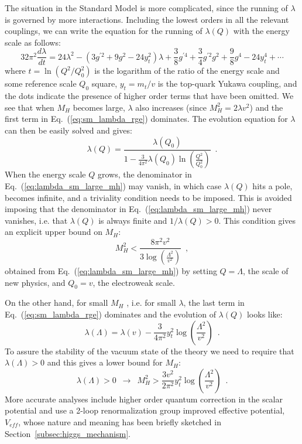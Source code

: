 \documentclass[prd,preprint,aps,floats,superscriptaddress,floatfix,nofootinbib]{revtex4}
\begin{document}
The situation in the Standard Model is more complicated, since the
running of $\lambda$ is governed by more interactions. Including the
lowest orders in all the relevant couplings, we can write the equation
for the running of $\lambda(Q)$ with the energy scale as follows:
\begin{equation}
\label{eq:sm_lambda_rge}
32\pi^2\frac{d\lambda}{dt}=
24\lambda^2-(3g^{\prime 2}+9g^2-24y_t^2)\lambda
+\frac{3}{8}g^{\prime 4}+\frac{3}{4}g^{\prime 2}g^2+\frac{9}{8}g^4
-24y_t^4+\cdots
\end{equation}
where $t\!=\!\ln(Q^2/Q_0^2)$ is the logarithm of the ratio of the
energy scale and some reference scale $Q_0$ square, $y_t\!=\!m_t/v$ is
the top-quark Yukawa coupling, and the dots indicate the presence of
higher order terms that have been omitted. We see that when $M_H$
becomes large, $\lambda$ also increases (since $M_H^2\!=\!2\lambda
v^2$) and the first term in Eq.~(\ref{eq:sm_lambda_rge})
dominates. The evolution equation for $\lambda$ can then be easily
solved and gives:
\begin{equation}
\label{eq:lambda_sm_large_mh}
\lambda(Q)=\frac{\lambda(Q_0)}{1-\frac{3}{4\pi^2}\lambda(Q_0)
\ln\left(\frac{Q^2}{Q_0^2}\right)}\,\,\,.
\end{equation}
When the energy scale $Q$ grows, the
denominator in Eq.~(\ref{eq:lambda_sm_large_mh}) may vanish, in which
case $\lambda(Q)$ hits a pole, becomes infinite, and a triviality
condition needs to be imposed. This is avoided imposing that the
denominator in Eq.~(\ref{eq:lambda_sm_large_mh}) never vanishes, i.e. 
that $\lambda(Q)$ is always finite
and $1/\lambda(Q)>0$. This condition gives an explicit upper bound on
$M_H$:
\begin{equation}
M_H^2<\frac{8\pi^2v^2}{3\log\left(\frac{\Lambda^2}{v^2}\right)}\,\,\,,
\end{equation}
obtained from Eq.~(\ref{eq:lambda_sm_large_mh}) by setting
$Q\!=\!\Lambda$, the scale of new physics, and $Q_0\!=\!v$, the
electroweak scale.

On the other hand, for small $M_H$ , i.e. for small $\lambda$, the
last term in Eq.~(\ref{eq:sm_lambda_rge}) dominates and the
evolution of $\lambda(Q)$ looks like:
\begin{equation}
\lambda(\Lambda)=\lambda(v)-\frac{3}{4\pi^2}y_t^2
\log\left(\frac{\Lambda^2}{v^2}\right)\,\,\,.
\end{equation}
To assure the stability of the vacuum state of the theory we need to
require that $\lambda(\Lambda)\!>\!0$ and this gives a lower bound for
$M_H$:
\begin{equation}
\lambda(\Lambda)>0 \,\,\,\longrightarrow \,\,\,
M_H^2>\frac{3v^2}{2\pi^2}y_t^2\log\left(\frac{\Lambda^2}{v^2}\right)\,\,\,.
\end{equation}
More accurate analyses include higher order quantum correction in the
scalar potential and use a 2-loop renormalization group improved
effective potential, $V_{eff}$, whose nature and meaning has been
briefly sketched in Section~\ref{subsec:higgs_mechanism}.
\end{document}
